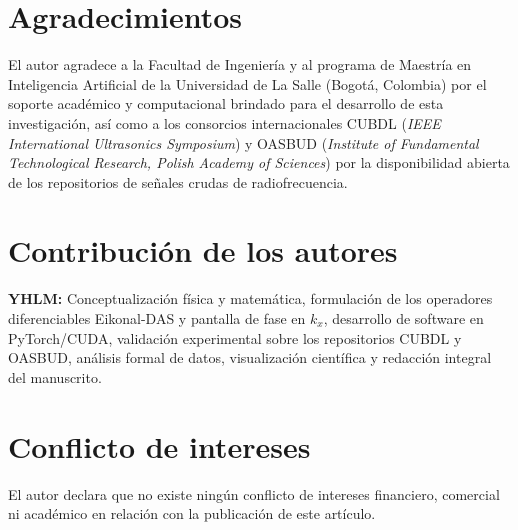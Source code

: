 \documentclass[9pt]{article}
\begin{document}
\section*{Agradecimientos}
El autor agradece a la Facultad de Ingeniería y al programa de Maestría en Inteligencia Artificial de la Universidad de La Salle (Bogotá, Colombia) por el soporte académico y computacional brindado para el desarrollo de esta investigación, así como a los consorcios internacionales CUBDL (\textit{IEEE International Ultrasonics Symposium}) y OASBUD (\textit{Institute of Fundamental Technological Research, Polish Academy of Sciences}) por la disponibilidad abierta de los repositorios de señales crudas de radiofrecuencia.

\section*{Contribución de los autores}
\textbf{YHLM:} Conceptualización física y matemática, formulación de los operadores diferenciables Eikonal-DAS y pantalla de fase en $k_x$, desarrollo de software en PyTorch/CUDA, validación experimental sobre los repositorios CUBDL y OASBUD, análisis formal de datos, visualización científica y redacción integral del manuscrito.

\section*{Conflicto de intereses}
El autor declara que no existe ningún conflicto de intereses financiero, comercial ni académico en relación con la publicación de este artículo.

\printbibliography
\end{document}

